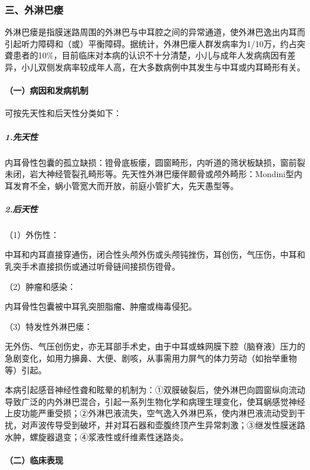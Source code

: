 \subsubsection{三、外淋巴瘘}

外淋巴瘘是指膜迷路周围的外淋巴与中耳腔之间的异常通道，使外淋巴逸出内耳而引起听力障碍和（或）平衡障碍。据统计，外淋巴瘘人群发病率为1/10万，约占突聋患者的10\%，目前临床对本病的认识不十分清楚，小儿与成年人发病病因有差异，小儿双侧发病率较成年人高，在大多数病例中其发生与中耳或内耳畸形有关。

\paragraph{（一）病因和发病机制}

可按先天性和后天性分类如下：

\subparagraph{1.先天性}

内耳骨性包囊的孤立缺损：镫骨底板瘘，圆窗畸形，内听道的筛状板缺损，窗前裂未闭，岩大神经管裂孔畸形等。先天性外淋巴瘘伴颞骨或颅外畸形：Mondini型内耳发育不全，蜗小管宽大而开放，前庭小管扩大，先天愚型等。

\subparagraph{2.后天性}

\hypertarget{text00359.htmlux5cux23CHP47-5-1-3-1-2-1}{}
（1）外伤性：

中耳和内耳直接穿通伤，闭合性头颅外伤或头颅钝挫伤，耳创伤，气压伤，中耳和乳突手术直接损伤或通过听骨链间接损伤镫骨。

\hypertarget{text00359.htmlux5cux23CHP47-5-1-3-1-2-2}{}
（2）肿瘤和感染：

内耳骨性包囊被中耳乳突胆脂瘤、肿瘤或梅毒侵犯。

\hypertarget{text00359.htmlux5cux23CHP47-5-1-3-1-2-3}{}
（3）特发性外淋巴瘘：

无外伤、气压创伤史，亦无耳部手术史，由于中耳或蛛网膜下腔（脑脊液）压力的急剧变化，如用力擤鼻、大便、剧咳，从事需用力屏气的体力劳动（如抬举重物等）引起。

本病引起感音神经性聋和眩晕的机制为：①双膜破裂后，使外淋巴向圆窗纵向流动导致广泛的内外淋巴混合，引起一系列生物化学和病理生理变化，使耳蜗感觉神经上皮功能严重受损；②外淋巴液流失，空气逸入外淋巴系，使内淋巴液流动受到干扰，对声波传导受到破坏，并对耳石器和壶腹终顶产生异常刺激；③继发性膜迷路水肿，螺旋器退变；④浆液性或纤维素性迷路炎。

\paragraph{（二）临床表现}

